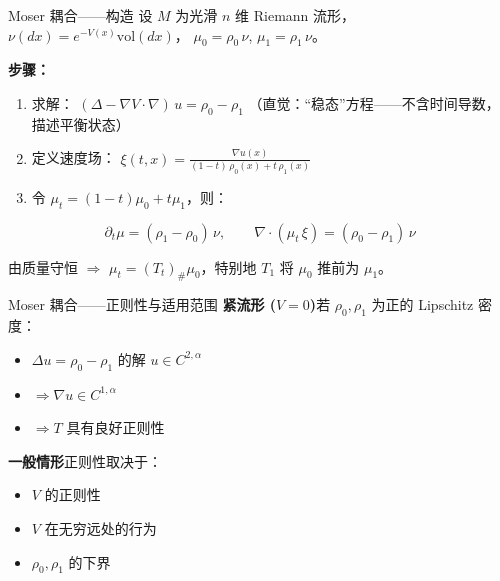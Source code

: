 \documentclass[aspectratio=169,10pt]{beamer}
\begin{document}
\begin{frame}{Moser 耦合——构造}
  设 $M$ 为光滑 $n$ 维 Riemann 流形，$\nu(dx)=e^{-V(x)}\mathrm{vol}(dx)$，
  $\mu_0=\rho_0\,\nu$, $\mu_1=\rho_1\,\nu$。

  \vspace{0.3em}
  \textbf{步骤：}
  \begin{enumerate}
    \item 求解：
      $\displaystyle(\Delta-\nabla V\cdot\nabla)\,u = \rho_0-\rho_1$
      \;（直觉：``稳态''方程——不含时间导数，描述平衡状态）
    \item 定义速度场：
      $\displaystyle\xi(t,x)=\frac{\nabla u(x)}{(1-t)\,\rho_0(x)+t\,\rho_1(x)}$
    \item 令 $\mu_t=(1-t)\mu_0+t\mu_1$，则：
  \end{enumerate}

  \[
    \partial_t\mu = (\rho_1-\rho_0)\,\nu,\qquad
    \nabla\cdot(\mu_t\,\xi)=(\rho_0-\rho_1)\,\nu
  \]

  \vspace{0.2em}
  由质量守恒 $\Rightarrow$ $\mu_t=(T_t)_{\#}\mu_0$，特别地 $T_1$ 将 $\mu_0$ 推前为 $\mu_1$。
\end{frame}

\begin{frame}{Moser 耦合——正则性与适用范围}
  \textbf{紧流形 ($V=0$)}\enspace 若 $\rho_0,\rho_1$ 为正的 Lipschitz 密度：
  \begin{itemize}
    \item $\Delta u = \rho_0-\rho_1$ 的解 $u\in C^{2,\alpha}$
    \item $\Rightarrow \nabla u\in C^{1,\alpha}$
    \item $\Rightarrow T$ 具有良好正则性
  \end{itemize}

  \medskip
  \textbf{一般情形}\enspace 正则性取决于：
  \begin{itemize}
    \item $V$ 的正则性
    \item $V$ 在无穷远处的行为
    \item $\rho_0,\rho_1$ 的下界
  \end{itemize}

  \vspace{0.5em}
\end{frame}
\end{document}
